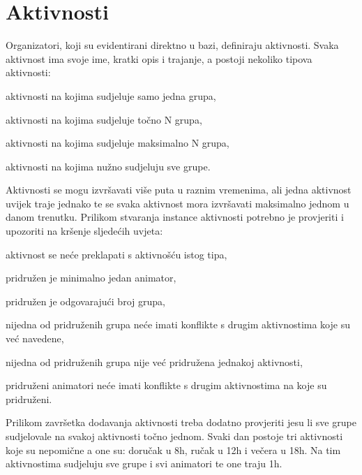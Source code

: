 		\section{Aktivnosti}
		Organizatori, koji su evidentirani direktno u bazi, definiraju aktivnosti. Svaka aktivnost ima svoje ime, kratki opis i trajanje, a postoji nekoliko tipova aktivnosti:
		\begin{packed_item}
			\item aktivnosti na kojima sudjeluje samo jedna grupa,
			\item aktivnosti na kojima sudjeluje točno N grupa,
			\item aktivnosti na kojima sudjeluje maksimalno N grupa,
			\item aktivnosti na kojima nužno sudjeluju sve grupe.
		\end{packed_item}
		Aktivnosti se mogu izvršavati više puta u raznim vremenima, ali jedna aktivnost uvijek traje jednako te se svaka aktivnost mora izvršavati maksimalno jednom u danom trenutku. Prilikom stvaranja instance aktivnosti potrebno je provjeriti i upozoriti na kršenje sljedećih uvjeta:
		\begin{packed_item}
			\item aktivnost se neće preklapati s aktivnošću istog tipa,
			\item pridružen je minimalno jedan animator,
			\item pridružen je odgovarajući broj grupa,
			\item nijedna od pridruženih grupa neće imati konflikte s drugim aktivnostima koje su već navedene,
			\item nijedna od pridruženih grupa nije već pridružena jednakoj aktivnosti,
			\item pridruženi animatori neće imati konflikte s drugim aktivnostima na koje su pridruženi.
		\end{packed_item}
		Prilikom završetka dodavanja aktivnosti treba dodatno provjeriti jesu li sve grupe sudjelovale na svakoj aktivnosti točno jednom. Svaki dan postoje tri aktivnosti koje su nepomične a one su: doručak u 8h, ručak u 12h i večera u 18h. Na tim aktivnostima sudjeluju sve grupe i svi animatori te one traju 1h.
		
